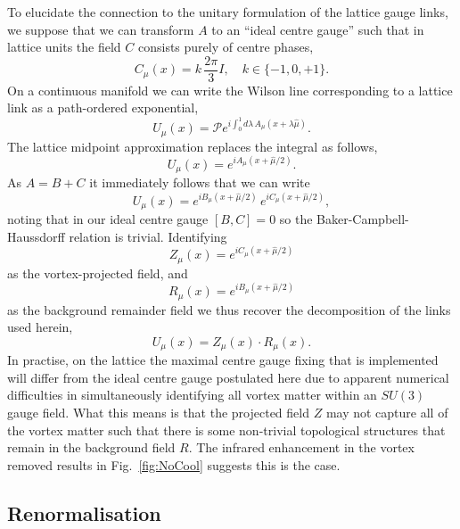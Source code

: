 To elucidate the connection to the unitary formulation of the lattice gauge links, we suppose that we can transform $A$ to an ``ideal centre gauge'' such that in lattice units the field $C$ consists purely of centre phases,
\begin{equation}
C_\mu(x) = k\,\frac{2\pi}{3} I,\quad k\in \{-1,0,+1\}.
\end{equation}
On a continuous manifold we can write the Wilson line corresponding to a lattice link as a path-ordered exponential,
\begin{equation}
U_{\mu}(x) = \mathcal{P} e^{i\int_0^1 d\lambda \,A_{\mu}(x+\lambda\hat{\mu})}.
\end{equation}
The lattice midpoint approximation replaces the integral as follows,
\begin{equation}
U_{\mu}(x) = e^{iA_{\mu}(x+\hat{\mu}/2)}.
\end{equation}
As $A = B + C$ it immediately follows that we can write
\begin{equation}
U_{\mu}(x) = e^{i B_{\mu}(x+\hat{\mu}/2)} \, e^{i C_{\mu}(x+\hat{\mu}/2)},
\end{equation}
noting that in our ideal centre gauge $[B,C] = 0$ so the Baker-Campbell-Haussdorff relation is trivial. Identifying
\begin{equation}
Z_{\mu}(x) = e^{i C_{\mu}(x+\hat{\mu}/2)}
\end{equation}
as the vortex-projected field, and
\begin{equation}
R_{\mu}(x) = e^{i B_{\mu}(x+\hat{\mu}/2)}
\end{equation}
as the background remainder field we thus recover the decomposition of the links used herein,
\begin{equation}
U_{\mu}(x) = Z_{\mu}(x)\cdot R_{\mu}(x).
\end{equation}
In practise, on the lattice the maximal centre gauge fixing that is implemented will differ from the ideal centre gauge postulated here due to apparent numerical difficulties in simultaneously identifying all vortex matter within an $SU(3)$ gauge field. What this means is that the projected field $Z$ may not capture all of the vortex matter such that there is some non-trivial topological structures that remain in the background field $R.$ The infrared enhancement in the vortex removed results in Fig.~\ref{fig:NoCool} suggests this is the case.\\

\subsection{Renormalisation}

